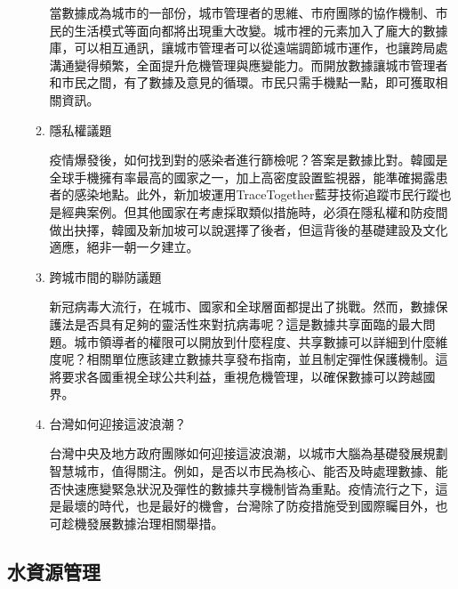 \documentclass[a4paper,12pt]{article}
\begin{document}
\begin{enumerate}
\begin{enumerate}
當數據成為城市的一部份，城市管理者的思維、市府團隊的協作機制、市民的生活模式等面向都將出現重大改變。城市裡的元素加入了龐大的數據庫，可以相互通訊，讓城市管理者可以從遠端調節城市運作，也讓跨局處溝通變得頻繁，全面提升危機管理與應變能力。而開放數據讓城市管理者和市民之間，有了數據及意見的循環。市民只需手機點一點，即可獲取相關資訊。\\
\item 隱私權議題
\label{sec:org4746ec6}

疫情爆發後，如何找到對的感染者進行篩檢呢？答案是數據比對。韓國是全球手機擁有率最高的國家之一，加上高密度設置監視器，能準確揭露患者的感染地點。此外，新加坡運用TraceTogether藍芽技術追蹤市民行蹤也是經典案例。但其他國家在考慮採取類似措施時，必須在隱私權和防疫間做出抉擇，韓國及新加坡可以說選擇了後者，但這背後的基礎建設及文化適應，絕非一朝一夕建立。\\
\item 跨城市間的聯防議題
\label{sec:org00b3596}

新冠病毒大流行，在城市、國家和全球層面都提出了挑戰。然而，數據保護法是否具有足夠的靈活性來對抗病毒呢？這是數據共享面臨的最大問題。城市領導者的權限可以開放到什麼程度、共享數據可以詳細到什麼維度呢？相關單位應該建立數據共享發布指南，並且制定彈性保護機制。這將要求各國重視全球公共利益，重視危機管理，以確保數據可以跨越國界。\\
\item 台灣如何迎接這波浪潮？
\label{sec:orge934e0c}

台灣中央及地方政府團隊如何迎接這波浪潮，以城市大腦為基礎發展規劃智慧城市，值得關注。例如，是否以市民為核心、能否及時處理數據、能否快速應變緊急狀況及彈性的數據共享機制皆為重點。疫情流行之下，這是最壞的時代，也是最好的機會，台灣除了防疫措施受到國際矚目外，也可趁機發展數據治理相關舉措。\\
\newpage
\end{enumerate}
\end{enumerate}

\subsection{水資源管理}
\label{sec:org62b3bbe}
\end{document}

